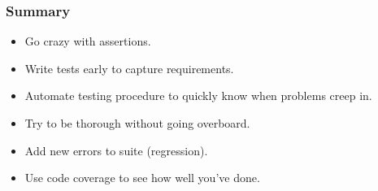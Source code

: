 \begin{frame}
  \frametitle{Summary}
  \begin{itemize}
  \item Go crazy with assertions.
  \item Write tests early to capture requirements.
  \item Automate testing procedure to quickly know when problems creep in.
  \item Try to be thorough without going overboard.
  \item Add new errors to suite (regression).
  \item Use code coverage to see how well you've done.
  \end{itemize}
\end{frame}
